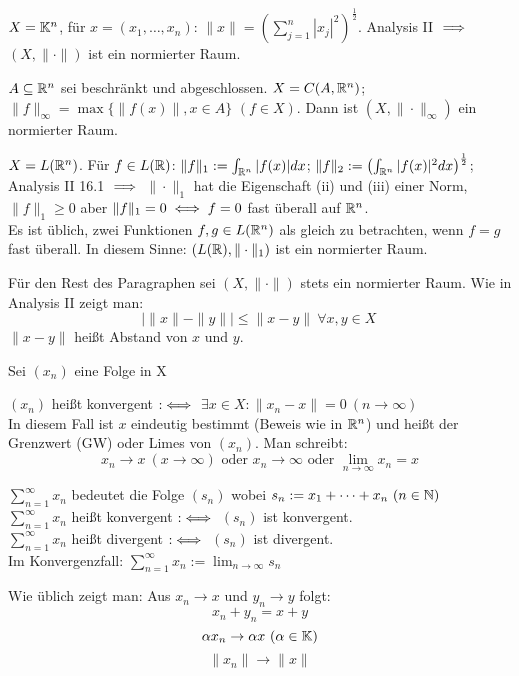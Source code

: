 \documentclass[a4paper,twoside,DIV15,BCOR12mm]{scrbook}
\begin{document}
\begin{beispiele}
\item $X = \mathbb{K}^n$, für $x=(x_1,\ldots,x_n)$: $\|x\| = \left( \sum_{j=1}^n |x_j|^2 \right)^\frac12$. Analysis II $\implies$ $(X,\|\cdot\|)$ ist ein normierter Raum.
\item $A\subseteq \mathbb{R}^n$ sei beschränkt und abgeschlossen. $X=C(A,\mathbb{R}^n)$; \\
$\|f\|_\infty = \max\{\|f(x)\|, x\in A\}$ $(f\in X)$. Dann ist $(X,\|\cdot\|_\infty)$ ein normierter Raum.
\item $X=L(\mathbb{R}^n)$. Für $f\in L(\mathbb{R})$: $\|f\|_1 := \int_{\mathbb{R}^n} |f(x)|dx$; $\|f\|_2 := \left(\int_{\mathbb{R}^n} |f(x)|^2 dx\right)^\frac12 $;
Analysis II 16.1 $\implies$ $\|\cdot\|_1$ hat die Eigenschaft (ii) und (iii) einer Norm, $\|f\|_1\ge 0$ aber $\|f\|_1=0 \iff f=0$ fast überall auf $\mathbb{R}^n$.\\
Es ist üblich, zwei Funktionen $f,g \in L(\mathbb{R}^n)$ als gleich zu betrachten, wenn $f=g$ fast überall. In diesem Sinne: $(L(\mathbb{R}),\|\cdot\|_1)$ ist ein normierter Raum.
\end{beispiele}

Für den Rest des Paragraphen sei $(X,\|\cdot\|)$ stets ein normierter Raum. Wie in Analysis II zeigt man:
$$ \left| \|x\| - \|y\| \right| \le \|x-y\| \ \forall x,y\in X\, $$
$\|x-y\|$ heißt Abstand von $x$ und $y$.

\begin{definition}
Sei $(x_n)$ eine Folge in X
\begin{liste}
\item $(x_n)$ heißt konvergent $:\iff$ $\exists x\in X: \|x_n - x\| = 0\ (n\to\infty)$\\
In diesem Fall ist $x$ eindeutig bestimmt (Beweis wie in $\mathbb{R}^n$) und heißt der Grenzwert (GW) oder Limes von $(x_n)$. Man schreibt:
\[ x_n \to x \ (x\to\infty) \text{ oder } x_n \to \infty \text{ oder } \lim_{n\to\infty}x_n = x \]
\item $\sum_{n=1}^\infty x_n$ bedeutet die Folge $(s_n)$ wobei $s_n := x_1+\cdots+x_n \ (n\in\MdN)$\\
 $\sum_{n=1}^\infty x_n$  heißt konvergent $:\iff$ $(s_n)$ ist konvergent.\\
 $\sum_{n=1}^\infty x_n$  heißt divergent $:\iff$ $(s_n)$ ist divergent.\\
 Im Konvergenzfall: $\sum_{n=1}^\infty x_n := \lim_{n\to\infty} s_n$
\end{liste}
\end{definition}
Wie üblich zeigt man: Aus $x_n\to x$ und $y_n\to y$ folgt:
\[x_n+y_n = x + y\]
\[\alpha x_n \to \alpha x \ (\alpha \in \mathbb{K})\]
\[\|x_n\|\to \|x\|\]
\end{document}
